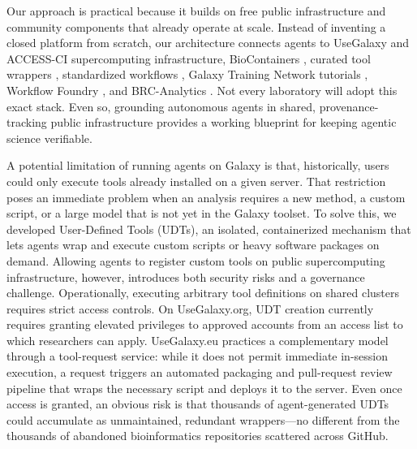 \documentclass[11pt,letterpaper]{article}
\begin{document}
Our approach is practical because it builds on free public infrastructure and community components that already operate at scale. Instead of inventing a closed platform from scratch, our architecture connects agents to UseGalaxy and ACCESS-CI supercomputing infrastructure, BioContainers \cite{biocontainers2017}, curated tool wrappers \cite{iuc2026}, standardized workflows \cite{iwc2026}, Galaxy Training Network tutorials \cite{batut2018, hiltemann2023}, Workflow Foundry \cite{foundry2026}, and BRC-Analytics \cite{brcanalytics2026}. Not every laboratory will adopt this exact stack. Even so, grounding autonomous agents in shared, provenance-tracking public infrastructure provides a working blueprint for keeping agentic science verifiable.

A potential limitation of running agents on Galaxy is that, historically, users could only execute tools already installed on a given server. That restriction poses an immediate problem when an analysis requires a new method, a custom script, or a large model that is not yet in the Galaxy toolset. To solve this, we developed User-Defined Tools (UDTs), an isolated, containerized mechanism that lets agents wrap and execute custom scripts or heavy software packages on demand. Allowing agents to register custom tools on public supercomputing infrastructure, however, introduces both security risks and a governance challenge. Operationally, executing arbitrary tool definitions on shared clusters requires strict access controls. On UseGalaxy.org, UDT creation currently requires granting elevated privileges to approved accounts from an access list to which researchers can apply. UseGalaxy.eu practices a complementary model through a tool-request service: while it does not permit immediate in-session execution, a request triggers an automated packaging and pull-request review pipeline that wraps the necessary script and deploys it to the server. Even once access is granted, an obvious risk is that thousands of agent-generated UDTs could accumulate as unmaintained, redundant wrappers---no different from the thousands of abandoned bioinformatics repositories scattered across GitHub.
\end{document}
